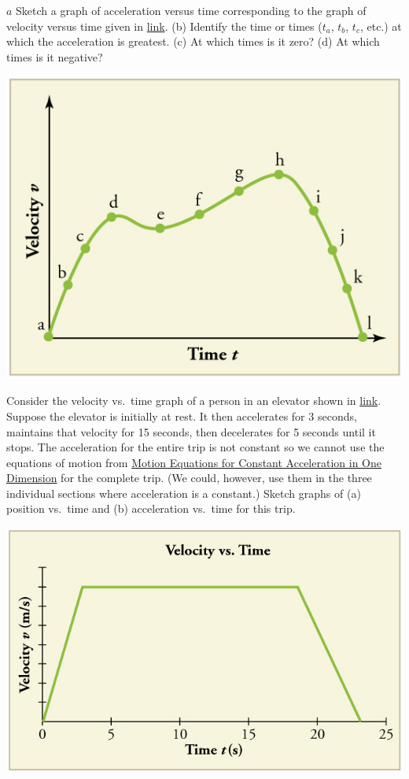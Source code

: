\documentclass[
]{book}
\begin{document}
\hypertarget{fs-id4131202}{}
\leavevmode{}%
\(a\) Sketch a graph of acceleration versus time corresponding to the
graph of velocity versus time given in
\protect\hyperlink{import-auto-id1447833}{link}. (b) Identify the
time or times (\(t_{a}\), \(t_{b}\), \(t_{c}\), etc.) at which the
acceleration is greatest. (c) At which times is it zero? (d) At which
times is it negative?

\includegraphics{images/Figure_03_08Sol_05.jpg}

\hypertarget{fs-id1365827}{}
\leavevmode{}%
Consider the velocity vs.~time graph of a person in an elevator shown in
\protect\hyperlink{import-auto-id2006890}{link}. Suppose the
elevator is initially at rest. It then accelerates for 3 seconds,
maintains that velocity for 15 seconds, then decelerates for 5 seconds
until it stops. The acceleration for the entire trip is not constant so
we cannot use the equations of motion from \href{/m54773}{Motion Equations for
Constant Acceleration in One Dimension} for the complete trip.
(We could, however, use them in the three individual sections where
acceleration is a constant.) Sketch graphs of (a) position vs.~time and
(b) acceleration vs.~time for this trip.

\includegraphics{images/Figure_03_08Sol_07.jpg}
\end{document}
